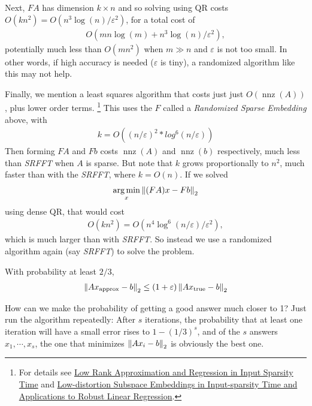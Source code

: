 \documentclass[11pt]{article}
\numberwithin{equation}{section}
\begin{document}
Next, $FA$ has dimension $k \times n$ and so solving using QR costs $O(kn^2) = O(n^3 \log(n)/\varepsilon^2)$, for a total cost of \begin{align*}
    O(mn\log(m) + n^3\log(n)/\varepsilon^2),
\end{align*}
potentially much less than $O(mn^2)$ when $m \gg n$ and $\varepsilon$ is not too small. In other words, if high accuracy is needed ($\varepsilon$ is tiny),
a randomized algorithm like this may not help.

Finally, we mention a least squares algorithm that costs just just $O(\operatorname{nnz}(A))$, plus lower order terms. 
\footnote{For details see \href{https://dl.acm.org/doi/pdf/10.1145/3019134}{Low Rank Approximation and Regression in Input Sparsity Time} and 
\href{https://dl.acm.org/doi/pdf/10.1145/2488608.2488621}{Low-distortion Subspace Embeddings in Input-sparsity Time and Applications to Robust Linear Regression}.}
This uses the $F$ called a \textit{Randomized Sparse Embedding} above, with \begin{align*}
    k = O((n/\varepsilon)^2*log^6(n/\varepsilon))
\end{align*}
Then forming $FA$ and $Fb$ costs $\operatorname{nnz}(A)$ and $\operatorname{nnz}(b)$ respectively, much less than \textit{SRFFT} when $A$ is sparse. 
But note that $k$ grows proportionally to $n^2$, much faster than with the \textit{SRFFT}, where $k=O(n)$. 
If we solved \begin{align*}
    \underset{x}{\arg\min} \left\| (FA)x - Fb \right\|_2
\end{align*} using dense QR, that would cost \begin{align*}
    O(kn^2) = O(n^4\log^6(n/\varepsilon)/\varepsilon^2),
\end{align*}
which is much larger than with \textit{SRFFT}. So instead we use a randomized algorithm again (say \textit{SRFFT}) to solve the problem.

\begin{theorem}
    With probability at least $2/3$, \begin{align*}
        \left\| A x_{\mathrm{approx}} - b \right\|_2 \leq (1+\varepsilon)\left\| Ax_{\mathrm{true}} - b \right\|_2
    \end{align*}
\end{theorem}

How can we make the probability of getting a good answer much closer to 1? Just run the algorithm repeatedly: After $s$ iterations, 
the probability that at least one iteration will have a small error rises to $1 - (1/3)^s$, and of the $s$ answers $x_1, \cdots, x_s$, 
the one that minimizes $\left\| Ax_i-b \right\|_2$ is obviously the best one.
\end{document}
